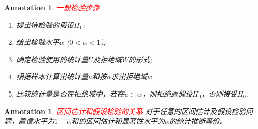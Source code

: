 \documentclass{article}
\newtheorem{annotation}[theorem]{Annotation}
\newcommand{\redt}[1]{\textcolor{red}{#1}}
\begin{document}
\begin{annotation}
\rm \redt{一般检验步骤}
\begin{enumerate}
	\item 提出待检验的假设$H_0$;
	\item 给出检验水平$\alpha$ ($0 < \alpha < 1$);
	\item 确定检验使用的统计量$U$及拒绝域$W$的形式;
	\item 根据样本计算出统计量$u$和按$\alpha$求出拒绝域$w$
	\item 比较统计量是否在拒绝域中，若在$u \in w $，则拒绝原假设$H_0$，否则接受$H_0$.
\end{enumerate}
\end{annotation}

\begin{annotation}
\rm \redt{区间估计和假设检验的关系} 对于任意的区间估计及假设检验问题，置信水平为$1-\alpha$和的区间估计和显著性水平为$\alpha$的统计推断等价。
\end{annotation}
\end{document}
